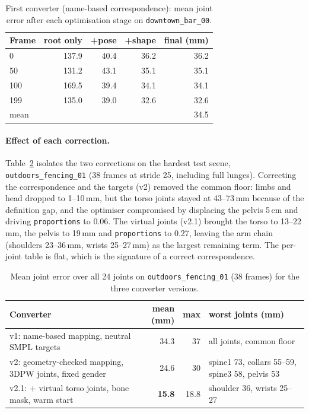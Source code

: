 \begin{table}[h]
\centering\small
\begin{tabular}{lrrrr}
\toprule
Frame & root only & +pose & +shape & final (mm) \\
\midrule
0   & 137.9 & 40.4 & 36.2 & 36.2 \\
50  & 131.2 & 43.1 & 35.1 & 35.1 \\
100 & 169.5 & 39.4 & 34.1 & 34.1 \\
199 & 135.0 & 39.0 & 32.6 & 32.6 \\
\midrule
mean & & & & 34.5 \\
\bottomrule
\end{tabular}
\caption{First converter (name-based correspondence): mean joint error after
each optimisation stage on \texttt{downtown\_bar\_00}.}
\label{tab:fit}
\end{table}

\paragraph{Effect of each correction.} Table~\ref{tab:fit_versions} isolates
the two corrections on the hardest test scene, \texttt{outdoors\_fencing\_01}
(38 frames at stride 25, including full lunges). Correcting the
correspondence and the targets (v2) removed the common floor: limbs and head
dropped to 1--10\,mm, but the torso joints stayed at 43--73\,mm because of the
definition gap, and the optimiser compromised by displacing the pelvis 5\,cm
and driving \texttt{proportions} to 0.06. The virtual joints (v2.1) brought
the torso to 13--22\,mm, the pelvis to 19\,mm and \texttt{proportions} to 0.27,
leaving the arm chain (shoulders 23--36\,mm, wrists 25--27\,mm) as the largest
remaining term. The per-joint table is flat, which is the signature of a
correct correspondence.

\begin{table}[h]
\centering\small
\begin{tabular}{p{5.6cm}rrp{4.6cm}}
\toprule
Converter & mean (mm) & max & worst joints (mm) \\
\midrule
v1: name-based mapping, neutral SMPL targets & 34.3 & 37 & all joints, common floor \\
v2: geometry-checked mapping, 3DPW joints, fixed gender & 24.6 & 30 & spine1 73, collars 55--59, spine3 58, pelvis 53 \\
v2.1: + virtual torso joints, bone mask, warm start & \textbf{15.8} & 18.8 & shoulder 36, wrists 25--27 \\
\bottomrule
\end{tabular}
\caption{Mean joint error over all 24 joints on \texttt{outdoors\_fencing\_01}
(38 frames) for the three converter versions.}
\label{tab:fit_versions}
\end{table}

